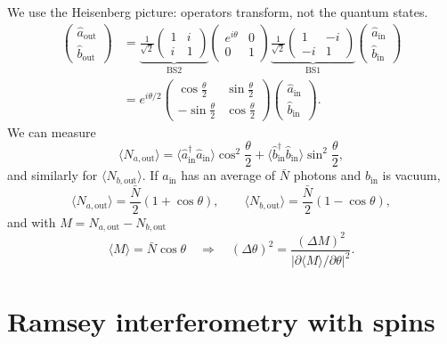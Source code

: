 \documentclass[11pt,a4paper]{article}
\newcommand{\expval}[1]{\langle #1\rangle}
\begin{document}
We use the Heisenberg picture: operators transform, not the quantum states.
\begin{align*}
  \begin{pmatrix}\hat a_{\text{out}}\\ \hat b_{\text{out}}\end{pmatrix}
  &= \underbrace{\frac{1}{\sqrt2}\begin{pmatrix}1&i\\ i&1\end{pmatrix}}_{\text{BS2}}
     \begin{pmatrix}e^{i\theta}&0\\0&1\end{pmatrix}
     \underbrace{\frac{1}{\sqrt2}\begin{pmatrix}1&-i\\ -i&1\end{pmatrix}}_{\text{BS1}}
     \begin{pmatrix}\hat a_{\text{in}}\\ \hat b_{\text{in}}\end{pmatrix}\\
  &= e^{i\theta/2}\begin{pmatrix}\cos\frac\theta2 & \sin\frac\theta2\\ -\sin\frac\theta2 & \cos\frac\theta2\end{pmatrix}
     \begin{pmatrix}\hat a_{\text{in}}\\ \hat b_{\text{in}}\end{pmatrix}.
\end{align*}
We can measure
\[
  \expval{N_{a,\text{out}}} = \expval{\hat a_{\text{in}}^\dagger\hat a_{\text{in}}}\cos^2\frac\theta2 + \expval{\hat b_{\text{in}}^\dagger\hat b_{\text{in}}}\sin^2\frac\theta2,
\]
and similarly for $\expval{N_{b,\text{out}}}$. If $a_{\text{in}}$ has an average of $\bar N$ photons and $b_{\text{in}}$ is vacuum,
\[
  \expval{N_{a,\text{out}}} = \frac{\bar N}{2}(1+\cos\theta), \qquad
  \expval{N_{b,\text{out}}} = \frac{\bar N}{2}(1-\cos\theta),
\]
and with $M=N_{a,\text{out}}-N_{b,\text{out}}$
\[
  \expval{M} = \bar N\cos\theta \quad\Rightarrow\quad
  (\Delta\theta)^2 = \frac{(\Delta M)^2}{\left|\partial\expval{M}/\partial\theta\right|^2}.
\]

\section{Ramsey interferometry with spins}
\end{document}
